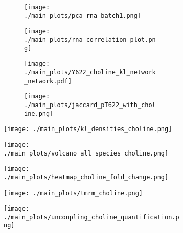 \begin{figure}[ht]
    \begin{subfigure}[t]{.2\textwidth}
        \begin{subfigure}[t]{\textwidth}
            \caption{}
            \texttt{[image: ./main\_plots/pca\_rna\_batch1.png]}        
        \end{subfigure}  
            \begin{subfigure}[t]{\textwidth}
            \caption{}
            \texttt{[image: ./main\_plots/rna\_correlation\_plot.png]}        
        \end{subfigure}  
    \end{subfigure}  
    \begin{subfigure}[t]{.225\textwidth}
        \begin{subfigure}[t]{\textwidth}
            \caption{}
            \texttt{[image: ./main\_plots/Y622\_choline\_kl\_network\_network.pdf]}        
        \end{subfigure}  
            \begin{subfigure}[t]{\textwidth}
            \caption{}
            \texttt{[image: ./main\_plots/jaccard\_pT622\_with\_choline.png]}        
        \end{subfigure}  
    \end{subfigure} 
    \begin{subfigure}[t]{.5\textwidth}
        \caption{}
        \texttt{[image: ./main\_plots/kl\_densities\_choline.png]}        
    \end{subfigure}  
    

    \begin{subfigure}[t]{.25\textwidth}
        \caption{}
        \texttt{[image: ./main\_plots/volcano\_all\_species\_choline.png]}        
    \end{subfigure}  
    \begin{subfigure}[t]{.15\textwidth}
        \caption{}
        \texttt{[image: ./main\_plots/heatmap\_choline\_fold\_change.png]}        
    \end{subfigure}  
    \begin{subfigure}[t]{.37\textwidth}
        \caption{}
        \texttt{[image: ./main\_plots/tmrm\_choline.png]}        
    \end{subfigure}  
    \begin{subfigure}[t]{.17\textwidth}
        \caption{}
        \texttt{[image: ./main\_plots/uncoupling\_choline\_quantification.png]}        
    \end{subfigure}  


\end{figure}
